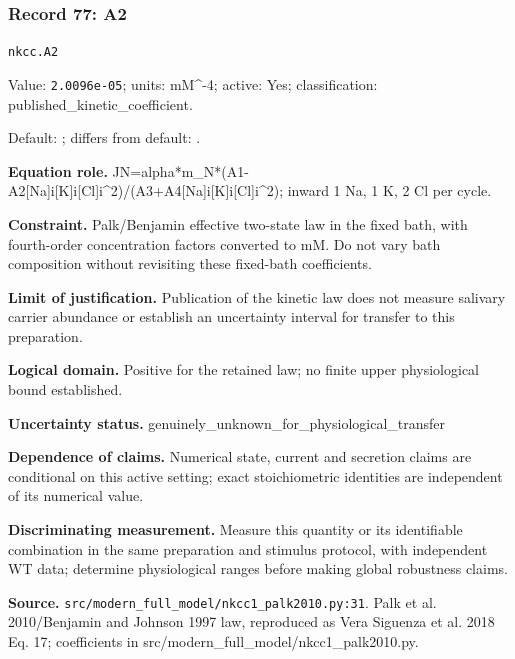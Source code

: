 \subsubsection*{Record 77: A2}
{\small \nolinkurl{nkcc.A2}\par

Value: \texttt{2.0096e-05}; units: mM\textasciicircum{}-4; active: Yes; classification: published\_kinetic\_coefficient.\par

Default: ; differs from default: .\par

\textbf{Equation role.} JN=alpha*m\_N*(A1-A2[Na]i[K]i[Cl]i\textasciicircum{}2)/(A3+A4[Na]i[K]i[Cl]i\textasciicircum{}2); inward 1 Na, 1 K, 2 Cl per cycle.\par

\textbf{Constraint.} Palk/Benjamin effective two-state law in the fixed bath, with fourth-order concentration factors converted to mM. Do not vary bath composition without revisiting these fixed-bath coefficients.\par

\textbf{Limit of justification.} Publication of the kinetic law does not measure salivary carrier abundance or establish an uncertainty interval for transfer to this preparation.\par

\textbf{Logical domain.} Positive for the retained law; no finite upper physiological bound established.\par

\textbf{Uncertainty status.} genuinely\_unknown\_for\_physiological\_transfer\par

\textbf{Dependence of claims.} Numerical state, current and secretion claims are conditional on this active setting; exact stoichiometric identities are independent of its numerical value.\par

\textbf{Discriminating measurement.} Measure this quantity or its identifiable combination in the same preparation and stimulus protocol, with independent WT data; determine physiological ranges before making global robustness claims.\par

\textbf{Source.} \nolinkurl{src/modern_full_model/nkcc1_palk2010.py:31}. Palk et al. 2010/Benjamin and Johnson 1997 law, reproduced as Vera Siguenza et al. 2018 Eq. 17; coefficients in src/modern\_full\_model/nkcc1\_palk2010.py.\par}

